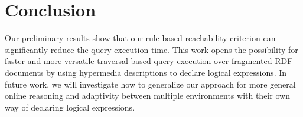 \section{Conclusion}

Our preliminary results show that our rule-based reachability criterion can significantly reduce the query execution time.
This work opens the possibility for faster and more versatile traversal-based query execution over fragmented RDF documents by using hypermedia descriptions to declare logical expressions.
In future work, we will investigate how to generalize our approach for more general online reasoning and adaptivity between multiple environments with their own way of declaring logical expressions.